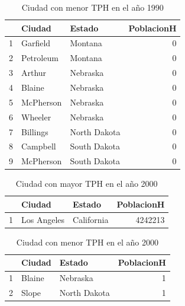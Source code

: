 \begin{table}[ht]
\centering
\begin{tabular}{rllr}
  \hline
 & Ciudad & Estado & PoblacionH \\ 
  \hline
1 & Garfield & Montana &   0 \\ 
  2 & Petroleum & Montana &   0 \\ 
  3 & Arthur & Nebraska &   0 \\ 
  4 & Blaine & Nebraska &   0 \\ 
  5 & McPherson & Nebraska &   0 \\ 
  6 & Wheeler & Nebraska &   0 \\ 
  7 & Billings & North Dakota &   0 \\ 
  8 & Campbell & South Dakota &   0 \\ 
  9 & McPherson & South Dakota &   0 \\ 
   \hline
\end{tabular}
\caption{Ciudad con menor TPH en el año 1990} 
\end{table}


\begin{table}[ht]
\centering
\begin{tabular}{rllr}
  \hline
 & Ciudad & Estado & PoblacionH \\ 
  \hline
1 & Los Angeles & California & 4242213 \\ 
   \hline
\end{tabular}
\caption{Ciudad con mayor TPH en el año 2000} 
\end{table}


\begin{table}[ht]
\centering
\begin{tabular}{rllr}
  \hline
 & Ciudad & Estado & PoblacionH \\ 
  \hline
1 & Blaine & Nebraska &   1 \\ 
  2 & Slope & North Dakota &   1 \\ 
   \hline
\end{tabular}
\caption{Ciudad con menor TPH en el año 2000} 
\end{table}


